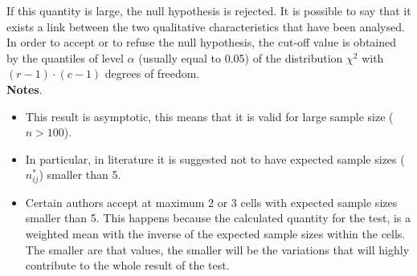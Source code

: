 \begin{frame}
  \begin{small}
    If this quantity is large, the null hypothesis is rejected. It is possible to say that it exists a link between the two qualitative characteristics that have been analysed.\\
    In order to accept or to refuse the null hypothesis, the cut-off value is obtained by the quantiles of level $ \alpha $ (usually equal to 0.05) of the distribution $ \chi^2 $ with $ (r-1) \cdot (c-1) $ degrees of freedom.\\
    \textbf{Notes}.
    \begin{itemize}
      \item This result is asymptotic, this means that it is valid for large sample size ($ n>100 $).
      \item In particular, in literature it is suggested not to have expected sample sizes ($ n_{ij}^* $) smaller than 5.\\
      \item Certain authors accept at maximum 2 or 3 cells with expected sample sizes smaller than 5. This happens because the calculated quantity for the test, is a weighted mean with the inverse of the expected sample sizes within the cells. The smaller are that values, the smaller will be the variations that will highly contribute to the whole result of the test.
    \end{itemize}
  \end{small}
\end{frame}

